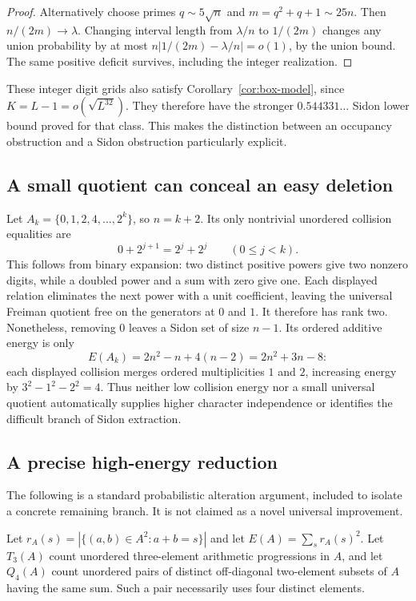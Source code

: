 \documentclass[11pt]{article}
\theoremstyle{definition}
\theoremstyle{remark}
\begin{document}
\begin{proof}
Alternatively choose primes $q\sim5\sqrt n$ and
$m=q^2+q+1\sim25n$. Then $n/(2m)\to\lambda$. Changing interval
length from $\lambda/n$ to $1/(2m)$ changes any union probability
by at most $n|1/(2m)-\lambda/n|=o(1)$, by the union bound.
The same positive deficit survives, including the integer realization.
\end{proof}

These integer digit grids also satisfy Corollary~\ref{cor:box-model},
since $K=L-1=o(\sqrt{L^{32}})$. They therefore have the stronger
$0.544331\ldots$ Sidon lower bound proved for that class. This makes
the distinction between an occupancy obstruction and a Sidon
obstruction particularly explicit.

\subsection{A small quotient can conceal an easy deletion}

Let $A_k=\{0,1,2,4,\ldots,2^k\}$, so $n=k+2$. Its only nontrivial
unordered collision equalities are
\[
0+2^{j+1}=2^j+2^j\qquad(0\le j<k).
\]
This follows from binary expansion: two distinct positive powers give
two nonzero digits, while a doubled power and a sum with zero give
one. Each displayed relation eliminates the next power with a unit
coefficient, leaving the universal Freiman quotient free on the
generators at $0$ and $1$. It therefore has rank two. Nonetheless,
removing $0$ leaves a Sidon set of size $n-1$.
Its ordered additive energy is only
\[
E(A_k)=2n^2-n+4(n-2)=2n^2+3n-8:
\]
each displayed collision merges ordered multiplicities $1$ and $2$,
increasing energy by $3^2-1^2-2^2=4$.
Thus neither low collision energy nor a small universal quotient
automatically supplies higher character independence or identifies
the difficult branch of Sidon extraction.

\subsection{A precise high-energy reduction}
\label{sec:energy-reduction}

The following is a standard probabilistic alteration argument, included
to isolate a concrete remaining branch. It is not claimed as a novel
universal improvement.

Let $r_A(s)=|\{(a,b)\in A^2:a+b=s\}|$ and let
$E(A)=\sum_s r_A(s)^2$. Let $T_3(A)$ count unordered three-element
arithmetic progressions in $A$, and let $Q_4(A)$ count unordered pairs
of distinct off-diagonal two-element subsets of $A$ having the same
sum. Such a pair necessarily uses four distinct elements.
\end{document}
